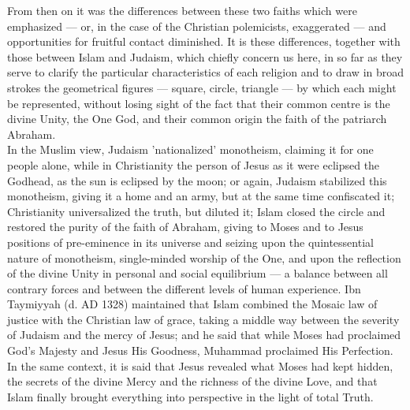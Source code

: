 \documentclass[10pt, twoside]{book}
\begin{document}
From then on it was the differences between these two faiths which were emphasized --- or, in the case 
of the Christian polemicists, exaggerated --- and opportunities for fruitful contact diminished. It is 
these differences, together with those between Islam and Judaism, which chiefly concern us here, in 
so far as they serve to clarify the particular characteristics of each religion and to draw in broad 
strokes the geometrical figures --- square, circle, triangle --- by which each might be represented, 
without losing sight of the fact that their common centre is the divine Unity, the One God, and their 
common origin the faith of the patriarch Abraham. \\

In the Muslim view, Judaism 'nationalized' monotheism, claiming it for one people alone, while in 
Christianity the person of Jesus as it were eclipsed the Godhead, as the sun is eclipsed by the moon; 
or again, Judaism stabilized this monotheism, giving it a home and an army, but at the same time 
confiscated it; Christianity universalized the truth, but diluted it; Islam closed the circle and 
restored the purity of the faith of Abraham, giving to Moses and to Jesus positions of pre\hyp{}eminence 
in its universe and seizing upon the quintessential nature of monotheism, single\hyp{}minded worship of 
the One, and upon the reflection of the divine Unity in personal and social equilibrium --- a balance 
between all contrary forces and between the different levels of human experience. Ibn Taymiyyah (d. 
AD 1328) maintained that Islam combined the Mosaic law of justice with the Christian law of grace, 
taking a middle way between the severity of Judaism and the mercy of Jesus; and he said that while 
Moses had proclaimed God's Majesty and Jesus His Goodness, Muhammad proclaimed His Perfection. In the 
same context, it is said that Jesus revealed what Moses had kept hidden, the secrets of the divine 
Mercy and the richness of the divine Love, and that Islam finally brought everything into perspective 
in the light of total Truth. \\
\end{document}
